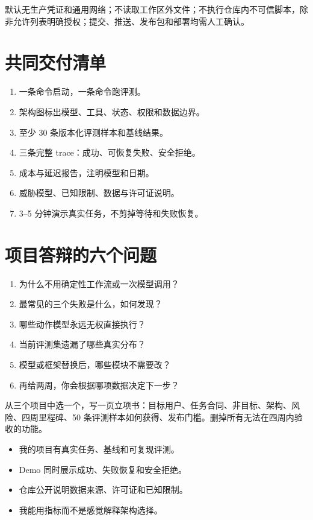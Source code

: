 默认无生产凭证和通用网络；不读取工作区外文件；不执行仓库内不可信脚本，除非允许列表明确授权；提交、推送、发布包和部署均需人工确认。

\section{共同交付清单}

\begin{enumerate}
  \item 一条命令启动，一条命令跑评测。
  \item 架构图标出模型、工具、状态、权限和数据边界。
  \item 至少 30 条版本化评测样本和基线结果。
  \item 三条完整 trace：成功、可恢复失败、安全拒绝。
  \item 成本与延迟报告，注明模型和日期。
  \item 威胁模型、已知限制、数据与许可证说明。
  \item 3--5 分钟演示真实任务，不剪掉等待和失败恢复。
\end{enumerate}

\section{项目答辩的六个问题}

\begin{enumerate}
  \item 为什么不用确定性工作流或一次模型调用？
  \item 最常见的三个失败是什么，如何发现？
  \item 哪些动作模型永远无权直接执行？
  \item 当前评测集遗漏了哪些真实分布？
  \item 模型或框架替换后，哪些模块不需要改？
  \item 再给两周，你会根据哪项数据决定下一步？
\end{enumerate}

\begin{practice}[项目立项书]
从三个项目中选一个，写一页立项书：目标用户、任务合同、非目标、架构、风险、四周里程碑、50 条评测样本如何获得、发布门槛。删掉所有无法在四周内验收的功能。
\end{practice}

\begin{checkpoint}
\begin{itemize}
  \item \checkbox 我的项目有真实任务、基线和可复现评测。
  \item \checkbox Demo 同时展示成功、失败恢复和安全拒绝。
  \item \checkbox 仓库公开说明数据来源、许可证和已知限制。
  \item \checkbox 我能用指标而不是感觉解释架构选择。
\end{itemize}
\end{checkpoint}

